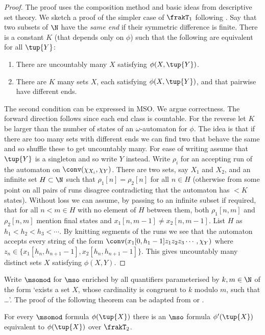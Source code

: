 \begin{proof}
The proof uses the composition method and basic ideas from descriptive set theory. We sketch a proof of the simpler case of $\frakT_1$ following \cite{KuLo05}. Say that two subsets of $\N$
have the {\em same end} if their symmetric difference is finite.  There is a constant $K$ (that depends only on $\phi$) such that the following are equivalent for all $\tup{Y}$:
\begin{enumerate}
\item There are uncountably many $X$ satisfying $\phi(X,\tup{Y})$.
\item There are $K$ many sets $X$, each satisfying $\phi(X,\tup{Y})$, and that pairwise have different ends.
\end{enumerate}
The second condition can be expressed in MSO. We argue correctness.
The forward direction follows since each end class is countable. For the reverse let $K$ be larger than the number of states of an $\omega$-automaton for $\phi$. The idea is that if there are too many sets with different ends we can find two that behave the same and so shuffle these to get uncountably many.  For ease of writing assume that $\tup{Y}$ is a singleton and so write $Y$ instead. Write  $\rho_i$ for an accepting run of the automaton on $\conv(\chi_{X_i},\chi_Y)$. There are two sets, say $X_1$ and $X_2$, and an infinite set $H \subset \N$ such that $\rho_1[n] = \rho_2[n]$ for all $n \in H$ (otherwise from some point on all pairs of runs disagree contradicting that the automaton has $<K$ states). Without loss we can assume, by passing to an infinite subset if required, that for all $n < m \in H$ with no element of $H$ between them, 
both $\rho_1[n,m]$ and $\rho_2[n,m]$ mention final states and $x_1[n,m-1] \neq x_2[n,m-1]$. List $H$ as $h_1 < h_2 < h_3 < \cdots$.
By knitting segments of the runs we see that the automaton accepts every string of the form $\conv(x_1[0,h_1-1]z_1z_2z_3\cdots,\chi_Y)$ where $z_n \in \{x_1[h_n,h_{n+1}-1],x_2[h_n,h_{n+1}-1]\}$.
This gives uncountably many distinct sets $X$ satisfying $\phi(X,Y)$.
\end{proof}

Write $\msomod$ for $\mso$ enriched by all quantifiers parameterised by $k,m \in \N$ of the form `exists a set $X$, whose cardinality is congruent to $k$ modulo $m$, such that \dots'. The proof of the following theorem can be adapted from \cite{KRS04} or \cite{KuLo05}.
\begin{theorem} 
For every $\msomod$ formula $\phi(\tup{X})$ there is an $\mso$ formula
$\phi'(\tup{X})$ equivalent to $\phi(\tup{X})$ over $\frakT_2$.
\end{theorem}

